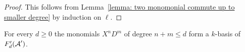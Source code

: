\begin{proof}
  This follows from Lemma~\ref{lemma: two monomonial commute up to smaller degree} by induction on $\ell$.
\end{proof}


% 


\begin{corollary}
  \label{corollary: basis of filtration subspaces}
  For every $d \geq 0$ the monomials $X^n D^m$ of degree $n + m \leq d$ form a $k$-basis of $F'_d(\operatorname{\mathcal{A}}')$.
\end{corollary}


